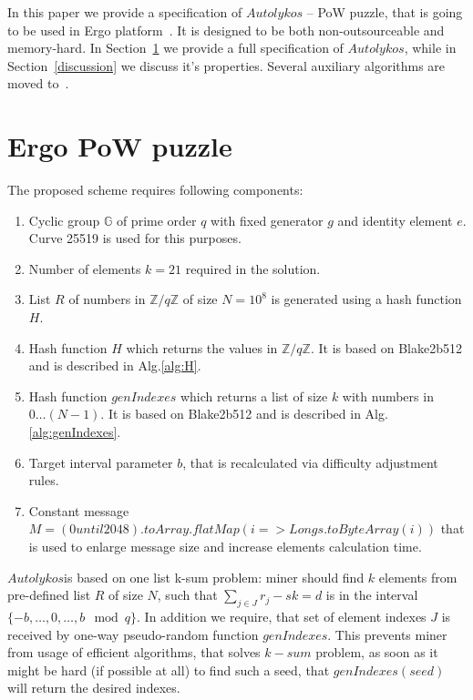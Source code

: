 \documentclass[]{article}
\newcommand{\Name}{$Autolykos$}
\begin{document}
    In this paper we provide a specification of \Name{} -- PoW puzzle, that is
    going to be used in Ergo platform~\cite{ergo}. It is designed to be both
    non-outsourceable and memory-hard. In Section~\ref{puzzle} we provide a full
    specification of \Name, while in Section~\ref{discussion} we discuss it's
    properties. Several auxiliary algorithms are moved to~.

    \section{Ergo PoW puzzle}
    \label{puzzle}

    The proposed scheme requires following components:
    \begin{enumerate}
        \item Cyclic group $\mathbb{G}$ of prime order $q$ with fixed generator $g$
        and identity element $e$.
        Curve 25519 is used for this purposes.
        \item Number of elements $k=21$ required in the solution.
        \item List $R$ of numbers in $\mathbb{Z}/q\mathbb{Z}$ of size $N=10^{8}$ is generated
        using a hash function $H$.
        \item Hash function $H$ which returns the values in $\mathbb{Z}/q\mathbb{Z}$.
        It is based on Blake2b512 and is described in Alg.\ref{alg:H}.
        \item Hash function $genIndexes$ which returns a list of size $k$ with numbers in $0\dots (N-1)$.
        It is based on Blake2b512 and is described in Alg.\ref{alg:genIndexes}.
        \item Target interval parameter $b$, that is recalculated via difficulty adjustment rules.
        \item Constant message $M=(0 until 2048).toArray.flatMap(i => Longs.toByteArray(i))$ that is used to enlarge message size and increase elements calculation time.
    \end{enumerate}

    \Name is based on one list k-sum problem: miner should find
    $k$ elements from pre-defined list $R$ of size $N$, such that
    $\sum_{j \in J} r_{j} - sk = d$ is in the interval $\{-b,\dots,0,\dots,b\mod q\}$.
    In addition we require, that set of element indexes $J$ is received
    by one-way pseudo-random function $genIndexes$. This prevents miner
    from usage of efficient algorithms, that solves $k-sum$ problem, as
    soon as it might be hard (if possible at all) to find such a seed,
    that $genIndexes(seed)$ will return the desired indexes.
\end{document}
